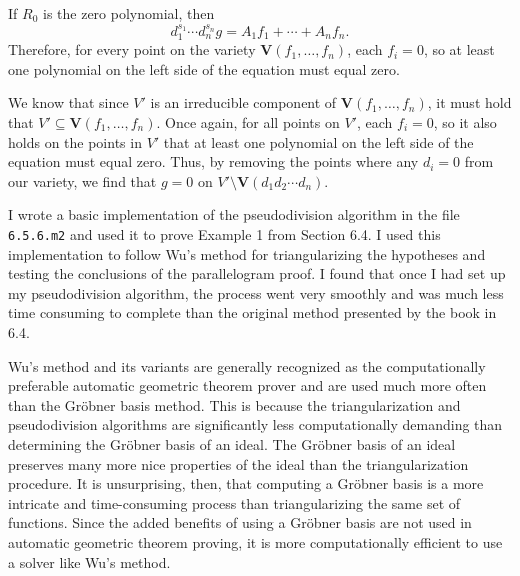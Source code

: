 \documentclass{article}
\theoremstyle{plain}
\theoremstyle{definition}
\theoremstyle{remark}
\newcommand{\gro}{Gr\"obner }
\begin{document}
If $R_0$ is the zero polynomial, then $$d_{1}^{s_1} \cdots d_n^{s_n} g = A_1 f_1 + \cdots + A_n f_n.$$
Therefore, for every point on the variety $\textbf{V}(f_1,\dots,f_n)$, each $f_i = 0$, so at least one polynomial on the left side of the equation must equal zero. 

We know that since $V'$ is an irreducible component of $\textbf{V}(f_1,\dots,f_n)$, it must hold that $V' \subseteq \textbf{V}(f_1,\dots,f_n)$.
Once again, for all points on $V'$, each $f_i = 0$, so it also holds on the points in $V'$ that at least one polynomial on the left side of the equation must equal zero.  
Thus, by removing the points where any $d_i = 0$ from our variety, we find that $g = 0$ on $V' \setminus \textbf{V}(d_1d_2\cdots d_n)$. 

I wrote a basic implementation of the pseudodivision algorithm in the file \texttt{6.5.6.m2} and used it to prove Example 1 from Section 6.4. 
I used this implementation to follow Wu's method for triangularizing the hypotheses and testing the conclusions of the parallelogram proof.
I found that once I had set up my pseudodivision algorithm, the process went very smoothly and was much less time consuming to complete than the original method presented by the book in 6.4.

Wu's method and its variants are generally recognized as the computationally preferable automatic geometric theorem prover and are used much more often than the Gröbner basis method.
This is because the triangularization and pseudodivision algorithms are significantly less computationally demanding than determining the Gröbner basis of an ideal.
The \gro basis of an ideal preserves many more nice properties of the ideal than the triangularization procedure. 
It is unsurprising, then, that computing a \gro basis is a more intricate and time-consuming process than triangularizing the same set of functions.
Since the added benefits of using a \gro basis are not used in automatic geometric theorem proving, it is more computationally efficient to use a solver like Wu's method.
\end{document}
